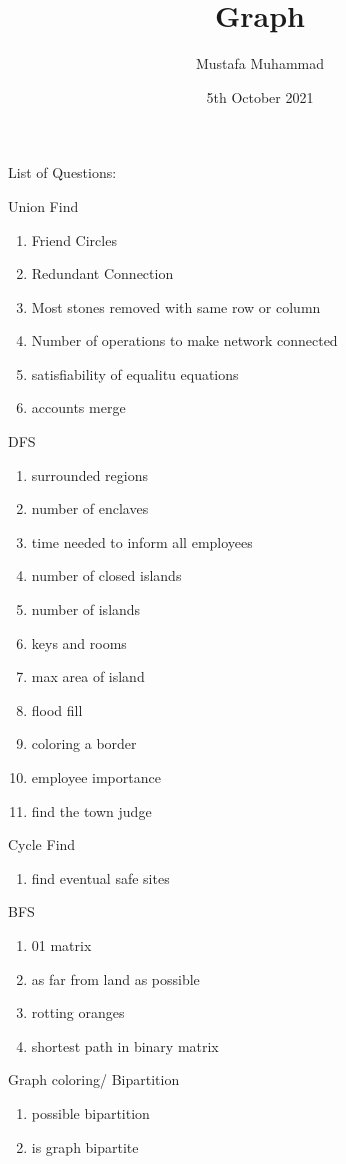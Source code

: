 \documentclass[24pt, a4]{article}
\title{Graph}
\author{Mustafa Muhammad}
\date{5th October 2021}
\begin{document}
\maketitle

\newpage

List of Questions:

Union Find
\begin{enumerate}
	\item Friend Circles
	\item Redundant Connection
	\item Most stones removed with same row or column
	\item Number of operations to make network connected
	\item satisfiability of equalitu equations
	\item accounts merge
\end{enumerate}

DFS
\begin{enumerate}
	\item surrounded regions
	\item number of enclaves
	\item time needed to inform all employees
	\item number of closed islands
	\item number of islands
	\item keys and rooms
	\item max area of island
	\item flood fill
	\item coloring a border
	\item employee importance
	\item find the town judge
\end{enumerate}

Cycle Find
\begin{enumerate}
	\item find eventual safe sites
\end{enumerate}

BFS
\begin{enumerate}
	\item 01 matrix
	\item as far from land as possible
	\item rotting oranges
	\item shortest path in binary matrix
\end{enumerate}

Graph coloring/ Bipartition
\begin{enumerate}
	\item possible bipartition
	\item is graph bipartite
\end{enumerate}
\end{document}
